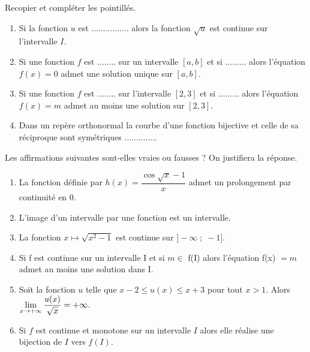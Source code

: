 



 \summary{}
 
	\begin{exercice}
	Recopier et compléter les pointillés.
\begin{enumerate}
 \item Si la fonction $ u $ est ................  alors la fonction  $ \sqrt{u} $ est continue  sur l'intervalle $ I $.
\item 
 Si une fonction  $ f  $ est ........ sur un intervalle $[a, b]$  et si  ......... alors l'équation $f(x) = 0$  admet une solution unique sur
$[a, b]$. 
\item Si une fonction  $ f  $ est ........ sur l'intervalle $[2, 3]$  et si  ......... alors l'équation $f(x) = m$ admet  au moins une solution  sur
$[2, 3]$.
 \item   Dans un repère orthonormal la courbe d'une fonction bijective et celle de sa réciproque sont symétriques ..............
 
\end{enumerate}
\end{exercice}
\begin{exercice}

Les affirmations suivantes sont-elles vraies ou fausses ? On justifiera la réponse.
\begin{enumerate}
\item La fonction définie par $ h(x)=\dfrac{\cos\sqrt{x}-1}{x} $  admet un prolongement par continuité en $ 0 $.

\item L'image d'un intervalle par une fonction est un intervalle.
\item La fonction $ x\longmapsto \sqrt{x^2-1} $ est continue sur $ ]-\infty\; ; \;-1] $.
\item  Si f est continue sur un intervalle I et si $ m\in $ f(I) alors l'équation f(x) $ =m $ admet au moins une
solution dans I.
 \item Soit la fonction $ u $  telle que $ x-2\leq u(x)\leq x+3 $  pour tout $  x>1 $.  Alors $\displaystyle \lim_{x\to +\infty}\dfrac{u(x)}{\sqrt{x}}=+\infty $.



\item  Si $ f $ est continue et monotone   sur un intervalle  $I $  alors elle réalise une bijection de $ I $  vers $ f(I) $.
\end{enumerate}
\end{exercice}
